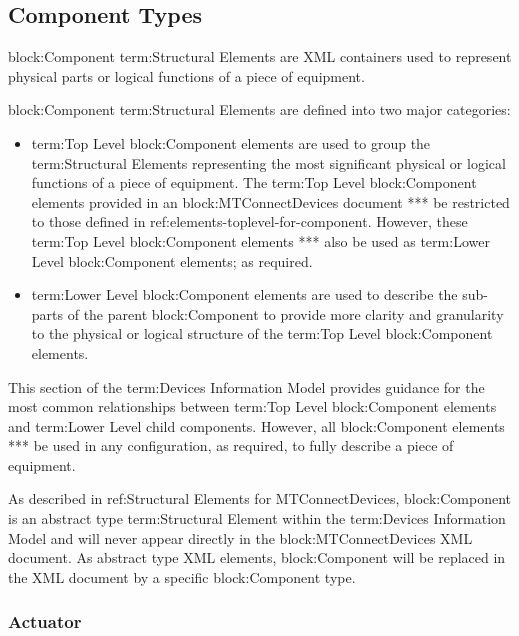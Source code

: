 \subsection{Component Types} \label{sec:ComponentTypes}

{block:Component} {term:Structural Elements} are XML containers used to represent physical parts or logical functions of a piece of equipment.

{block:Component} {term:Structural Elements} are defined into two major categories:

\begin{itemize}

\item {term:Top Level} {block:Component} elements are used to group the {term:Structural Elements} representing the most significant physical or logical functions of a piece of equipment.  The {term:Top Level} {block:Component} elements provided in an {block:MTConnectDevices} document **\should** be restricted to those defined in {ref:elements-toplevel-for-component}.  However, these {term:Top Level} {block:Component} elements **\may** also be used as {term:Lower Level} {block:Component} elements; as required.

\item {term:Lower Level} {block:Component} elements are used to describe the sub-parts of the parent {block:Component} to provide more clarity and granularity to the physical or logical structure of the {term:Top Level} {block:Component} elements.
\end{itemize}

This section of the {term:Devices Information Model} provides guidance for the most common relationships between {term:Top Level} {block:Component} elements and {term:Lower Level} child components.  However, all {block:Component} elements **\may** be used in any configuration, as required, to fully describe a piece of equipment.

As described in {ref:Structural Elements for MTConnectDevices}, {block:Component} is an abstract type {term:Structural Element} within the {term:Devices Information Model} and will never appear directly in the {block:MTConnectDevices} XML document.  As abstract type XML elements, {block:Component} will be replaced in the XML document by a specific {block:Component} type.


\subsubsection{Actuator}
  \label{sec:Actuator}


